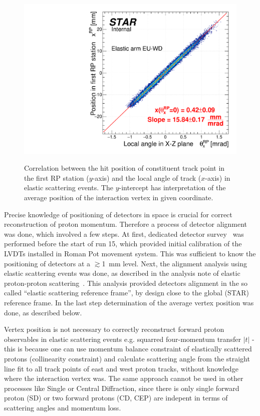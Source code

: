 \begin{figure}[b!]
{  \includegraphics[width=\linewidth,page=4]{graphics/rpSim/VxVy.pdf}
}\vspace{-5pt}%
\caption[Correlation between the hit position of constituent track point in the first RP station and the local angle of track in elastic scattering events.]%
{Correlation between the hit position of constituent track point in the first RP station ($y$-axis) and the local angle of track ($x$-axis) in elastic scattering events. The $y$-intercept has interpretation of the average position of the interaction vertex in given coordinate.}\label{fig:VxVy}%
\end{figure}


Precise knowledge of positioning of detectors in space is crucial for correct reconstruction of proton momentum. Therefore a process of detector alignment was done, which involved a few steps. At first, dedicated detector survey~\cite{surveyNote} was performed before the start of run 15, which provided initial calibration of the LVDTs installed in Roman Pot movement system. This was sufficient to know the positioning of detectors at a $\gtrsim$1~mm level. Next, the alignment analysis using elastic scattering events was done, as described in the analysis note of elastic proton-proton scattering~\cite{ElasticNote}. This analysis provided detectors alignment in the so called ``elastic scattering reference frame'', by design close to the global (STAR) reference frame. In the last step determination of the average vertex position was done, as described below.

Vertex position is not necessary to correctly reconstruct forward proton observables in elastic scattering events  e.g. squarred four-momentum transfer $|t|$ - this is because one can use momentum balance constraint of elastically scattered protons (collinearity constraint) and calculate scattering angle from the straight line fit to all track points of east and west proton tracks, without knowledge where the interaction vertex was. The same approach cannot be used in other processes like Single or Central Diffraction, since there is only single forward proton (SD) or two forward protons (CD, CEP) are indepent in terms of scattering angles and momentum loss.

